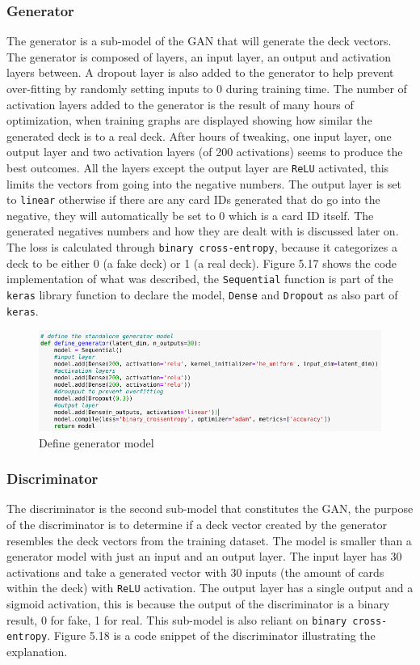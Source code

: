\documentclass{report} %
\begin{document}
\subsubsection{Generator}
The generator is a sub-model of the GAN that will generate the deck vectors. The generator is composed of layers, an input layer, an output and activation layers between. A dropout layer is also added to the generator to help prevent over-fitting by randomly setting inputs to 0 during training time. The number of activation layers added to the generator is the result of many hours of optimization, when training graphs are displayed showing how similar the generated deck is to a real deck. After hours of tweaking, one input layer, one output layer and two activation layers (of 200 activations) seems to produce the best outcomes. All the layers except the output layer are \texttt{ReLU} activated, this limits the vectors from going into the negative numbers. The output layer is set to \texttt{linear} otherwise if there are any card IDs generated that do go into the negative, they will automatically be set to 0 which is a card ID itself. The generated negatives numbers and how they are dealt with is discussed later on. The loss is calculated through \texttt{binary cross-entropy}, because it categorizes a deck to be either 0 (a fake deck) or 1 (a real deck). Figure 5.17 shows the code implementation of what was described, the \nolinkurl{Sequential} function is part of the \texttt{keras} library function to declare the model, \nolinkurl{Dense} and \nolinkurl{Dropout} as also part of \texttt{keras}.

\begin{figure}[H]
\centering
\includegraphics[width=1.25\textwidth]{generator}
\caption{Define generator model\protect}
\label{board}
\end{figure}
\subsubsection{Discriminator}
The discriminator is the second sub-model that constitutes the GAN, the purpose of the discriminator is to determine if a deck vector created by the generator resembles the deck vectors from the training dataset. The model is smaller than a generator model with just an input and an output layer. The input layer has 30 activations and take a generated vector with 30 inputs (the amount of cards within the deck) with \texttt{ReLU} activation. The output layer has a single output and a sigmoid activation, this is because the output of the discriminator is a binary result, 0 for fake, 1 for real. This sub-model is also reliant on \texttt{binary cross-entropy}. Figure 5.18 is a code snippet of the discriminator illustrating the explanation.
\end{document}
